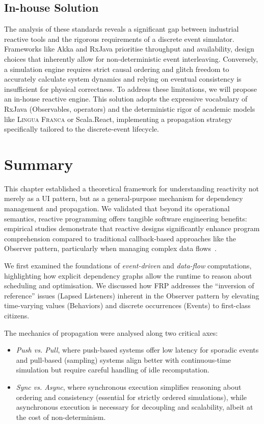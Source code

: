 \subsection{In-house Solution}\label{ssec:in_house}
The analysis of these standards reveals a significant gap between industrial
reactive tools and the rigorous requirements of a discrete event simulator.
Frameworks like Akka and RxJava prioritise throughput and availability, design
choices that inherently allow for non-deterministic event interleaving.
Conversely, a simulation engine requires strict causal ordering and glitch
freedom to accurately calculate system dynamics and relying on eventual
consistency is insufficient for physical correctness. To address these
limitations, we will propose an in-house reactive engine. This solution adopts
the expressive vocabulary of RxJava (Observables, operators) and the
deterministic rigor of academic models like \textsc{Lingua Franca} or
Scala.React, implementing a propagation strategy specifically tailored to the
discrete-event lifecycle.

\section{Summary}

This chapter established a theoretical framework for understanding reactivity
not merely as a UI pattern, but as a general-purpose mechanism for dependency
management and propagation. We validated that beyond its operational semantics,
reactive programming offers tangible software engineering benefits: empirical
studies demonstrate that reactive designs significantly enhance program
comprehension compared to traditional callback-based approaches like the
Observer pattern, particularly when managing complex data
flows~\cite{salvaneschi2017PERPSC}.

We first examined the foundations of \emph{event-driven} and \emph{data-flow}
computations, highlighting how explicit dependency graphs allow the runtime to
reason about scheduling and optimisation. We discussed how \ac{FRP} addresses
the ``inversion of reference'' issues (Lapsed Listeners) inherent in the
Observer pattern by elevating time-varying values (Behaviors) and discrete
occurrences (Events) to first-class citizens.

The mechanics of propagation were analysed along two critical axes:
\begin{itemize}
	\item \emph{Push vs. Pull}, where push-based systems offer low latency for
	      sporadic events and pull-based (sampling) systems align better with
	      continuous-time simulation but require careful handling of idle
	      recomputation.
	\item \emph{Sync vs. Async}, where synchronous execution simplifies
	      reasoning about ordering and consistency (essential for strictly
	      ordered simulations), while asynchronous execution is necessary for
	      decoupling and scalability, albeit at the cost of non-determinism.
\end{itemize}

